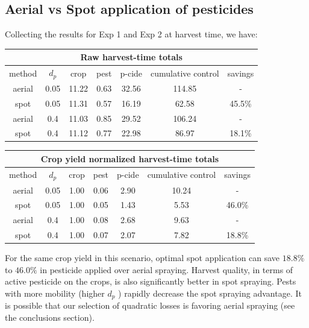 \documentclass[11pt]{article}
\begin{document}
\subsection{Aerial vs Spot application of pesticides}

Collecting the results for Exp 1 and Exp 2 at harvest time, we have:

\begin{center}
	\begin{tabular}{ | c | c | c| c| c| c| c| }
	\hline
	\multicolumn{7}{|c|}{Raw harvest-time totals} \\
	\hline
    method & $d_p$ & crop & pest & p-cide & cumulative control & savings \\
    \hline
    aerial & 0.05 & 11.22 & 0.63 & 32.56 & 114.85 & - \\
    \hline
    spot & 0.05 & 11.31 & 0.57 & 16.19 & 62.58 & 45.5\% \\
    \hline
    aerial & 0.4 & 11.03 & 0.85 & 29.52 & 106.24 & - \\
    \hline
    spot & 0.4 & 11.12 & 0.77 & 22.98 & 86.97 & 18.1\% \\
    \hline
    \end{tabular}
\end{center}

\begin{center}
	\begin{tabular}{ | c | c | c| c| c| c| c| }
	\hline
	\multicolumn{7}{|c|}{Crop yield normalized harvest-time totals} \\
	\hline
    method & $d_p$ & crop & pest & p-cide & cumulative control & savings \\
    \hline
    aerial & 0.05 & 1.00 & 0.06 & 2.90 & 10.24 & - \\
    \hline
    spot & 0.05 & 1.00 & 0.05 & 1.43 & 5.53 & 46.0\% \\
    \hline
    aerial & 0.4 & 1.00 & 0.08 & 2.68 & 9.63 & - \\
    \hline
    spot & 0.4 & 1.00 & 0.07 & 2.07 & 7.82 & 18.8\% \\
    \hline
    \end{tabular}
\end{center}

For the same crop yield in this scenario, optimal spot application can save $18.8\%$ to $46.0\%$ in pesticide applied over aerial spraying. Harvest quality, in terms of active pesticide on the crops, is also significantly better in spot spraying. Pests with more mobility (higher $d_p$ ) rapidly decrease the spot spraying advantage. It is possible that our selection of quadratic losses is favoring aerial spraying (see the conclusions section).
\end{document}
